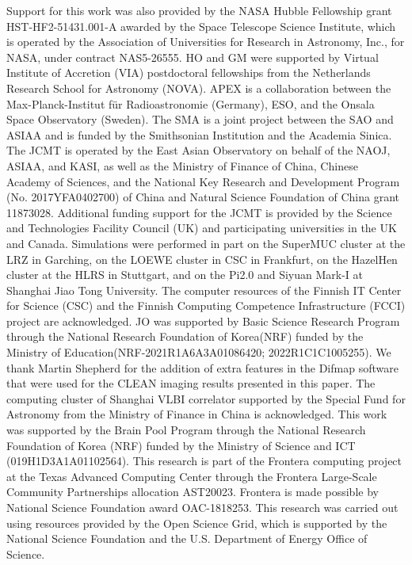 Support for this work was also provided by the NASA Hubble Fellowship 
grant HST-HF2-51431.001-A awarded 
by the Space Telescope Science Institute, which is operated by the Association of Universities for 
Research in Astronomy, Inc., for NASA, under contract NAS5-26555.
HO and GM were supported by Virtual Institute of Accretion (VIA) postdoctoral fellowships from the Netherlands Research School for Astronomy (NOVA).
APEX is a collaboration between the
Max-Planck-Institut f{\"u}r Radioastronomie (Germany),
ESO, and the Onsala Space Observatory (Sweden). The
SMA is a joint project between the SAO and ASIAA
and is funded by the Smithsonian Institution and the
Academia Sinica. The JCMT is operated by the East
Asian Observatory on behalf of the NAOJ, ASIAA, and
KASI, as well as the Ministry of Finance of China, Chinese
Academy of Sciences, and the National Key Research and Development
Program (No. 2017YFA0402700) of China
and Natural Science Foundation of China grant 11873028.
Additional
funding support for the JCMT is provided by the Science
and Technologies Facility Council (UK) and participating
universities in the UK and Canada. 
Simulations were performed in part on the SuperMUC cluster at the LRZ in Garching, 
on the 
LOEWE cluster in CSC in Frankfurt, on the HazelHen cluster at the HLRS in Stuttgart, 
and on the Pi2.0 and Siyuan Mark-I at Shanghai Jiao Tong University.
The computer resources of the Finnish IT Center for Science (CSC) and the Finnish Computing 
Competence Infrastructure (FCCI) project are acknowledged.
JO was supported by Basic Science Research Program through the National Research
Foundation of Korea(NRF) funded by the Ministry of Education(NRF-2021R1A6A3A01086420;
2022R1C1C1005255).
We thank Martin Shepherd for the addition of extra features in the Difmap software 
that were used for the CLEAN imaging results presented in this paper.
The computing cluster of Shanghai VLBI correlator supported by the Special Fund 
for Astronomy from the Ministry of Finance in China is acknowledged.
This work was supported by the Brain Pool Program through the National Research
Foundation 
of Korea (NRF) funded by the Ministry of Science and ICT (019H1D3A1A01102564).
This research is part of the Frontera computing project at the Texas Advanced 
Computing Center through the Frontera Large-Scale Community Partnerships allocation
AST20023. Frontera is made possible by National Science Foundation award OAC-1818253.
This research was carried out using resources provided by the Open Science Grid, 
which is supported by the National Science Foundation and the U.S. Department of 
Energy Office of Science.

